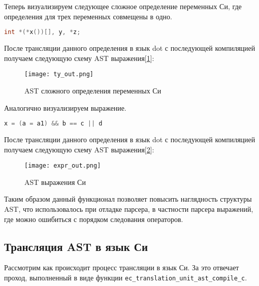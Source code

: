 
\clearpage
Теперь визуализируем следующее сложное определение переменных Си, где определения для трех переменных совмещены в одно.
\begin{lstlisting}[language=c]
int *(*x())[], y, *z;
\end{lstlisting}

После трансляции данного определения в язык dot с последующей компиляцией
получаем следующую схему AST выражения[\ref{graphviz:decl}]:

\begin{figure}[h!]
    \texttt{[image: ty\_out.png]}
    \centering
    \caption{AST сложного определения переменных Си}
    \label{graphviz:decl}
\end{figure}

\clearpage
Аналогично визуализируем выражение.
\begin{lstlisting}[language=c]
x = (a = a1) && b == c || d
\end{lstlisting}

После трансляции данного определения в язык dot с последующей компиляцией
получаем следующую схему AST выражения[\ref{graphviz:expr}]:
\begin{figure}[h!]
    \texttt{[image: expr\_out.png]}
    \centering
    \caption{AST выражения Си}
    \label{graphviz:expr}
\end{figure}

Таким образом данный функционал позволяет повысить наглядность структуры AST, что использовалось при отладке парсера, в частности парсера выражений, где можно ошибиться с порядком следования операторов.








\subsection{Трансляция AST в язык Си}
\label{pass:compile-c}


Рассмотрим как происходит процесс трансляции в язык Си. За это отвечает проход, выполненный в виде функции \hfill\break\verb|ec_translation_unit_ast_compile_c|.


